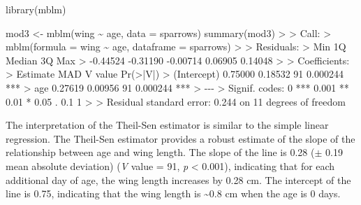 \documentclass[
  letterpaper,
]{book}
\newenvironment{Shaded}{\begin{snugshade}}{\end{snugshade}}
\newcommand{\AttributeTok}[1]{\textcolor[rgb]{0.40,0.45,0.13}{#1}}
\newcommand{\DecValTok}[1]{\textcolor[rgb]{0.68,0.00,0.00}{#1}}
\newcommand{\ErrorTok}[1]{\textcolor[rgb]{0.68,0.00,0.00}{#1}}
\newcommand{\FloatTok}[1]{\textcolor[rgb]{0.68,0.00,0.00}{#1}}
\newcommand{\FunctionTok}[1]{\textcolor[rgb]{0.28,0.35,0.67}{#1}}
\newcommand{\NormalTok}[1]{\textcolor[rgb]{0.00,0.23,0.31}{#1}}
\newcommand{\OtherTok}[1]{\textcolor[rgb]{0.00,0.23,0.31}{#1}}
\newcommand{\SpecialCharTok}[1]{\textcolor[rgb]{0.37,0.37,0.37}{#1}}
\newcommand{\StringTok}[1]{\textcolor[rgb]{0.13,0.47,0.30}{#1}}
\begin{document}
\begin{Shaded}
\begin{Highlighting}[]
\FunctionTok{library}\NormalTok{(mblm)}

\NormalTok{mod3 }\OtherTok{\textless{}{-}} \FunctionTok{mblm}\NormalTok{(wing }\SpecialCharTok{\textasciitilde{}}\NormalTok{ age, }\AttributeTok{data =}\NormalTok{ sparrows)}
\FunctionTok{summary}\NormalTok{(mod3)}
\SpecialCharTok{\textgreater{}} 
\ErrorTok{\textgreater{}}\NormalTok{ Call}\SpecialCharTok{:}
\ErrorTok{\textgreater{}} \FunctionTok{mblm}\NormalTok{(}\AttributeTok{formula =}\NormalTok{ wing }\SpecialCharTok{\textasciitilde{}}\NormalTok{ age, }\AttributeTok{dataframe =}\NormalTok{ sparrows)}
\SpecialCharTok{\textgreater{}} 
\ErrorTok{\textgreater{}}\NormalTok{ Residuals}\SpecialCharTok{:}
\ErrorTok{\textgreater{}}\NormalTok{      Min       }\DecValTok{1}\NormalTok{Q   Median       }\DecValTok{3}\NormalTok{Q      Max }
\SpecialCharTok{\textgreater{}} \SpecialCharTok{{-}}\FloatTok{0.44524} \SpecialCharTok{{-}}\FloatTok{0.31190} \SpecialCharTok{{-}}\FloatTok{0.00714}  \FloatTok{0.06905}  \FloatTok{0.14048} 
\SpecialCharTok{\textgreater{}} 
\ErrorTok{\textgreater{}}\NormalTok{ Coefficients}\SpecialCharTok{:}
\ErrorTok{\textgreater{}}\NormalTok{             Estimate     MAD V value }\FunctionTok{Pr}\NormalTok{(}\SpecialCharTok{\textgreater{}}\ErrorTok{|}\NormalTok{V}\SpecialCharTok{|}\NormalTok{)    }
\SpecialCharTok{\textgreater{}}\NormalTok{ (Intercept)  }\FloatTok{0.75000} \FloatTok{0.18532}      \DecValTok{91} \FloatTok{0.000244} \SpecialCharTok{**}\ErrorTok{*}
\ErrorTok{\textgreater{}}\NormalTok{ age          }\FloatTok{0.27619} \FloatTok{0.00956}      \DecValTok{91} \FloatTok{0.000244} \SpecialCharTok{**}\ErrorTok{*}
\ErrorTok{\textgreater{}} \SpecialCharTok{{-}{-}{-}}
\ErrorTok{\textgreater{}}\NormalTok{ Signif. codes}\SpecialCharTok{:}  \DecValTok{0} \StringTok{\textquotesingle{}***\textquotesingle{}} \FloatTok{0.001} \StringTok{\textquotesingle{}**\textquotesingle{}} \FloatTok{0.01} \StringTok{\textquotesingle{}*\textquotesingle{}} \FloatTok{0.05} \StringTok{\textquotesingle{}.\textquotesingle{}} \FloatTok{0.1} \StringTok{\textquotesingle{} \textquotesingle{}} \DecValTok{1}
\SpecialCharTok{\textgreater{}} 
\ErrorTok{\textgreater{}}\NormalTok{ Residual standard error}\SpecialCharTok{:} \FloatTok{0.244}\NormalTok{ on }\DecValTok{11}\NormalTok{ degrees of freedom}
\end{Highlighting}
\end{Shaded}

The interpretation of the Theil-Sen estimator is similar to the simple
linear regression. The Theil-Sen estimator provides a robust estimate of
the slope of the relationship between age and wing length. The slope of
the line is 0.28 (\(\pm\) 0.19 mean absolute deviation) (\emph{V} value
= 91, \emph{p} \textless{} 0.001), indicating that for each additional
day of age, the wing length increases by 0.28 cm. The intercept of the
line is 0.75, indicating that the wing length is \textasciitilde0.8 cm
when the age is 0 days.
\end{document}

